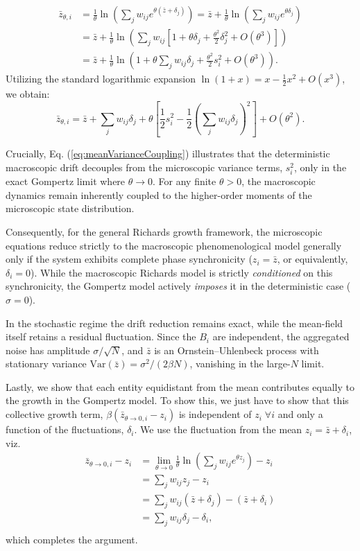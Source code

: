 \documentclass{article}
\begin{document}
\begin{align}
\bar{z}_{\theta,i} &= \frac{1}{\theta}\ln\left(\sum_j w_{ij} e^{\theta (\bar{z} + \delta_j)}\right) = \bar{z} + \frac{1}{\theta}\ln\left(\sum_j w_{ij} e^{\theta \delta_j}\right) \\
&= \bar{z} + \frac{1}{\theta}\ln\left( \sum_j w_{ij} \left[1 + \theta \delta_j + \frac{\theta^2}{2} \delta_j^2 + O(\theta^3)\right]\right) \\
&= \bar{z} + \frac{1}{\theta}\ln\left( 1 + \theta \sum_j w_{ij}\delta_j + \frac{\theta^2}{2} s_i^2 + O(\theta^3)\right).
\end{align}
Utilizing the standard logarithmic expansion $\ln(1 + x) = x - \frac{1}{2}x^2 + O(x^3)$, we obtain:
\begin{equation}
\bar{z}_{\theta,i} = \bar{z} + \sum_j w_{ij}\delta_j + \theta \left[ \frac{1}{2}s_i^2 - \frac{1}{2}\left(\sum_j w_{ij}\delta_j\right)^2 \right] + O(\theta^2). \label{eq:meanVarianceCoupling}
\end{equation}

Crucially, Eq. (\ref{eq:meanVarianceCoupling}) illustrates that the deterministic macroscopic drift decouples from the microscopic variance terms, $s_i^2$, only in the exact Gompertz limit where $\theta \to 0$. For any finite $\theta > 0$, the macroscopic dynamics remain inherently coupled to the higher-order moments of the microscopic state distribution.

Consequently, for the general Richards growth framework, the microscopic equations reduce strictly to the macroscopic phenomenological model generally only if the system exhibits complete phase synchronicity ($z_i = \bar{z}$, or equivalently, $\delta_i = 0$). While the macroscopic Richards model is strictly \emph{conditioned} on this synchronicity, the Gompertz model actively \emph{imposes} it in the deterministic case ($\sigma = 0$). 

In the stochastic regime the drift reduction remains exact, while the mean-field itself retains a residual fluctuation. Since the $B_i$ are independent, the aggregated noise has amplitude $\sigma/\sqrt N$, and $\bar z$ is an Ornstein–Uhlenbeck process with stationary variance $\mathrm{Var}(\bar z) = \sigma^2/(2\beta N)$, vanishing in the large-$N$ limit.

Lastly, we show that each entity equidistant from the mean contributes equally to the growth in the Gompertz model. To show this, we just have to show that this collective growth term, $\beta (\bar{z}_{\theta\rightarrow0,i} - z_i)$ is independent of $z_i \; \forall i$ and only a function of the fluctuations, $\delta_i$. We use the fluctuation from the mean $z_i = \bar{z} + \delta_i $,  viz.
\begin{align*}
  \bar{z}_{\theta\rightarrow0,i} - z_i &= \lim_{\theta\rightarrow0}\frac{1}{\theta}\ln\left(\sum_jw_{ij}e^{\theta z_j}\right) - z_i \\
  &= \sum_jw_{ij} z_j - z_i \\
  &= \sum_jw_{ij} (\bar{z} + \delta_j) - (\bar{z} + \delta_i) \\
  &= \sum_jw_{ij} \delta_j - \delta_i,  \\
\end{align*}
which completes the argument.
\end{document}
